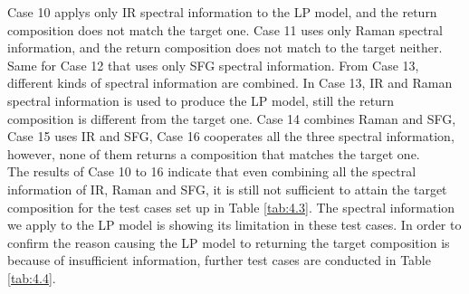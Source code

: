 Case 10 applys only IR spectral information to the LP model, and the return composition does not match the target one. Case 11 uses only Raman spectral information, and the return composition does not match to the target neither. Same for Case 12 that uses only SFG spectral information. From Case 13, different kinds of spectral information are combined. In Case 13, IR and Raman spectral information is used to produce the LP model, still the return composition is different from the target one. Case 14 combines Raman and SFG, Case 15 uses IR and SFG, Case 16 cooperates all the three spectral information, however, none of them returns a composition that matches the target one. \\

The results of Case 10 to 16 indicate that even combining all the spectral information of IR, Raman and SFG, it is still not sufficient to attain the target composition for the test cases set up in Table \ref{tab:4.3}. The spectral information we apply to the LP model is showing its limitation in these test cases. In order to confirm the reason causing the LP model to returning the target composition is because of insufficient information, further test cases are conducted in Table \ref{tab:4.4}. \\


